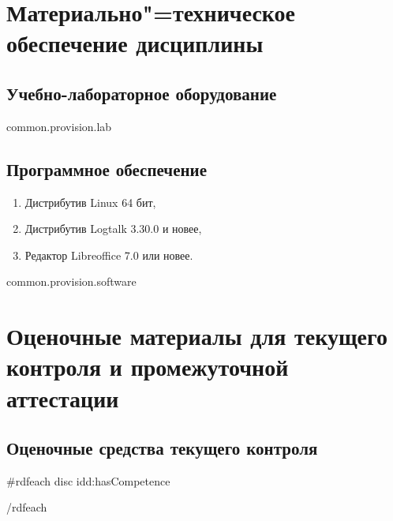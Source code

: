 \documentclass[12pt]{scrartcl}
\newcommand{\rdf}[2]{#2}
\newenvironment{rdfctx}[1]{}{}
\begin{document}
\section{Материально"=техническое обеспечение дисциплины}

\subsection{Учебно-лабораторное оборудование}

{{common.provision.lab}}

\subsection{Программное обеспечение}
\begin{rdfctx}{\rdfsetctx{list}{syll wpdd:itemList !wpdd:EReferenceList !wpdd:ItemList}}
  \begin{enumerate}
    \item \rdf{list ^schema:member !wpdd:ListItem !wpdd:Software}{Дистрибутив Linux 64 бит, }
    \item \rdf{list ^schema:member !wpdd:ListItem !wpdd:Software}{Дистрибутив Logtalk 3.30.0 и новее, }
    \item \rdf{list ^schema:member !wpdd:ListItem !wpdd:Software}{Редактор Libreoffice 7.0 или новее. }
  \end{enumerate}
\end{rdfctx}

{{common.provision.software}}

\section{Оценочные материалы для текущего контроля и промежуточной аттестации}


\subsection{Оценочные средства текущего контроля}
{{#rdfeach disc idd:hasCompetence}}


{{/rdfeach}}

\vspace{1em}
\end{document}
